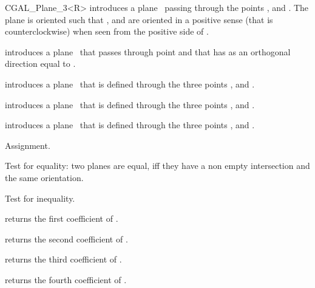 \begin {classtemplate} {CGAL_Plane_3<R>}
{introduces a plane \var\ passing through the points ,
  and . The plane is oriented such that , 
  and  are oriented in a positive sense 
 (that is counterclockwise) when seen from the positive side of \var.}


{introduces a plane \var\ that passes through point  and
 that has as an orthogonal direction equal to .}

{introduces a plane \var\ that is defined through the  three points 
 ,  and .}

{introduces a plane \var\ that is defined through the  three points 
 ,  and .}

{introduces a plane \var\ that is defined through the  three points 
 ,  and .}

\operations
\threecolumns{5cm}{4cm}

\hidden {}
        {Assignment.}

       {Test for equality: two planes are equal, iff they have a non 
        empty intersection and the same orientation.}

       {Test for inequality.}

       {returns the first coefficient of .}

       {returns the second coefficient of .}

       {returns the third coefficient of .}

       {returns the fourth coefficient of .}


\end{classtemplate}
